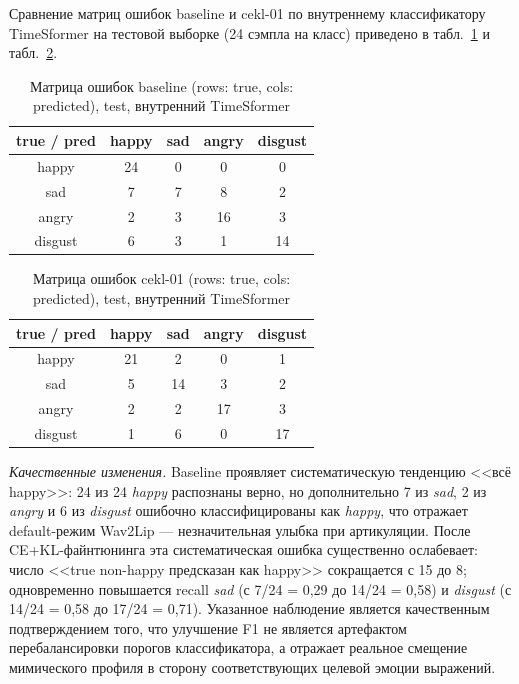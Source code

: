 \documentclass[a4paper, 12pt, oneside, openany]{article}
\begin{document}
Сравнение матриц ошибок baseline и cekl-01 по внутреннему классификатору TimeSformer на тестовой выборке (24 сэмпла на класс) приведено в табл.~\ref{tab:cm_baseline} и табл.~\ref{tab:cm_cekl01}.

\begin{table}[H]
\caption{Матрица ошибок baseline (rows: true, cols: predicted), test, внутренний TimeSformer}
\label{tab:cm_baseline}
\centering
\small
\begin{tabular}{|c|c|c|c|c|}
\hline
true / pred & happy & sad & angry & disgust \\
\hline
happy & 24 & 0 & 0 & 0 \\
\hline
sad & 7 & 7 & 8 & 2 \\
\hline
angry & 2 & 3 & 16 & 3 \\
\hline
disgust & 6 & 3 & 1 & 14 \\
\hline
\end{tabular}
\end{table}

\begin{table}[H]
\caption{Матрица ошибок cekl-01 (rows: true, cols: predicted), test, внутренний TimeSformer}
\label{tab:cm_cekl01}
\centering
\small
\begin{tabular}{|c|c|c|c|c|}
\hline
true / pred & happy & sad & angry & disgust \\
\hline
happy & 21 & 2 & 0 & 1 \\
\hline
sad & 5 & 14 & 3 & 2 \\
\hline
angry & 2 & 2 & 17 & 3 \\
\hline
disgust & 1 & 6 & 0 & 17 \\
\hline
\end{tabular}
\end{table}

\textit{Качественные изменения.} Baseline проявляет систематическую тенденцию <<всё happy>>: 24 из 24 \textit{happy} распознаны верно, но дополнительно 7 из \textit{sad}, 2 из \textit{angry} и 6 из \textit{disgust} ошибочно классифицированы как \textit{happy}, что отражает default-режим Wav2Lip --- незначительная улыбка при артикуляции. После CE+KL-файнтюнинга эта систематическая ошибка существенно ослабевает: число <<true non-happy предсказан как happy>> сокращается с 15 до 8; одновременно повышается recall \textit{sad} (с 7/24 = 0,29 до 14/24 = 0,58) и \textit{disgust} (с 14/24 = 0,58 до 17/24 = 0,71). Указанное наблюдение является качественным подтверждением того, что улучшение F1 не является артефактом перебалансировки порогов классификатора, а отражает реальное смещение мимического профиля в сторону соответствующих целевой эмоции выражений.
\end{document}
